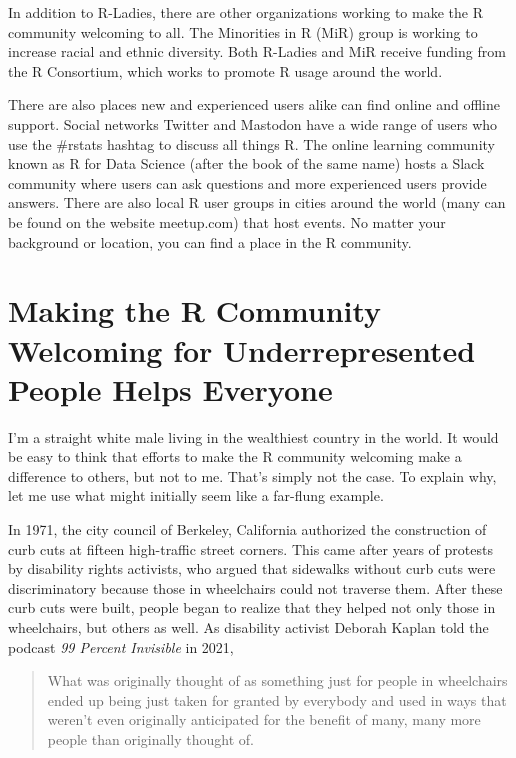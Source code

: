 \documentclass[
]{book}
\begin{document}
In addition to R-Ladies, there are other organizations working to make the R community welcoming to all. The Minorities in R (MiR) group is working to increase racial and ethnic diversity. Both R-Ladies and MiR receive funding from the R Consortium, which works to promote R usage around the world.

There are also places new and experienced users alike can find online and offline support. Social networks Twitter and Mastodon have a wide range of users who use the \#rstats hashtag to discuss all things R. The online learning community known as R for Data Science (after the book of the same name) hosts a Slack community where users can ask questions and more experienced users provide answers. There are also local R user groups in cities around the world (many can be found on the website meetup.com) that host events. No matter your background or location, you can find a place in the R community.

\hypertarget{making-the-r-community-welcoming-for-underrepresented-people-helps-everyone}{%
\section*{Making the R Community Welcoming for Underrepresented People Helps Everyone}\label{making-the-r-community-welcoming-for-underrepresented-people-helps-everyone}}

I'm a straight white male living in the wealthiest country in the world. It would be easy to think that efforts to make the R community welcoming make a difference to others, but not to me. That's simply not the case. To explain why, let me use what might initially seem like a far-flung example.

In 1971, the city council of Berkeley, California authorized the construction of curb cuts at fifteen high-traffic street corners. This came after years of protests by disability rights activists, who argued that sidewalks without curb cuts were discriminatory because those in wheelchairs could not traverse them. After these curb cuts were built, people began to realize that they helped not only those in wheelchairs, but others as well. As disability activist Deborah Kaplan told the podcast \emph{99 Percent Invisible} in 2021,

\begin{quote}
What was originally thought of as something just for people in wheelchairs ended up being just taken for granted by everybody and used in ways that weren't even originally anticipated for the benefit of many, many more people than originally thought of.
\end{quote}
\end{document}

